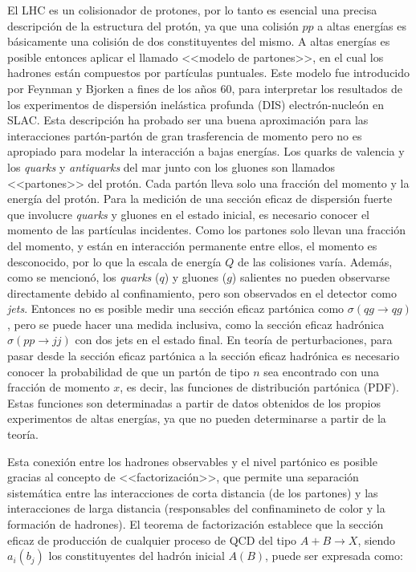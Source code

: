 El LHC es un colisionador de protones, por lo tanto es esencial una precisa
descripción de la estructura del protón, ya que una colisión $pp$ a altas
energías es básicamente una colisión de dos constituyentes del mismo.
A altas energías es posible entonces aplicar el llamado <<modelo de
partones>>, en el cual los hadrones están compuestos por partículas puntuales.
Este modelo fue introducido por Feynman \cite{PhysRevLett.23.1415} y Bjorken
\cite{PhysRev.185.1975} a fines de los a\~nos 60, para interpretar los
resultados de los experimentos de dispersión inelástica profunda (DIS)
electrón-nucleón en SLAC. Esta descripción ha probado ser una buena aproximación
para las interacciones partón-partón de gran trasferencia de momento pero no es
apropiado para modelar la interacción a bajas energías. Los quarks de valencia y
los \emph{quarks} y \emph{antiquarks} del mar junto con los gluones son llamados
<<partones>> del protón. Cada partón lleva solo una fracción del momento y la
energía del protón. Para la medición de una sección eficaz de dispersión fuerte
que involucre \emph{quarks} y gluones en el estado inicial, es necesario conocer el
momento de las partículas incidentes. Como los partones solo llevan una fracción
del momento, y están en interacción permanente entre ellos, el momento es
desconocido, por lo que la escala de energía $Q$ de las colisiones varía. Además,
como se mencionó, los \emph{quarks} ($q$) y
gluones ($g$) salientes no pueden observarse directamente debido al confinamiento,
pero son observados en el detector como \emph{jets}. Entonces no es posible
medir una sección eficaz partónica como $\sigma(qg \to qg)$, pero se puede hacer
una medida inclusiva, como la sección eficaz hadrónica $\sigma(pp \to jj)$ con
dos jets en el estado final. En teoría de perturbaciones, para pasar desde la
sección eficaz partónica a la sección eficaz hadrónica es necesario conocer la
probabilidad de que un partón de tipo $n$ sea encontrado con una fracción de
momento $x$, es decir, las funciones de distribución partónica (PDF). Estas
funciones son determinadas a partir de datos obtenidos de los propios
experimentos de altas energías, ya que no pueden determinarse a partir de la
teoría.

Esta conexión entre los hadrones observables y el nivel partónico es posible
gracias al concepto de <<factorización>>, que permite una separación
sistemática entre las interacciones de corta distancia (de los partones) y las
interacciones de larga distancia (responsables del confinamineto de color y la
formación de hadrones). El teorema de factorización \cite{Ellis1978281}
establece que la sección eficaz de producción de cualquier proceso de QCD del
tipo $A+B\to X$, siendo $a_i(b_j)$ los constituyentes del hadrón inicial $A(B)$,
puede ser expresada como:

